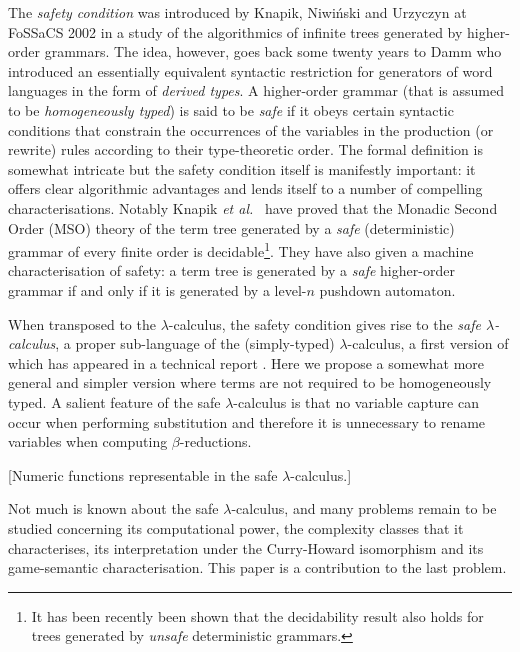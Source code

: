 \documentclass{llncs}
\begin{document}
The \emph{safety condition} was introduced by Knapik, Niwi{\'n}ski and
Urzyczyn at FoSSaCS 2002 \cite{KNU02} in a study of the algorithmics
of infinite trees generated by higher-order grammars. The idea,
however, goes back some twenty years to Damm \cite{Dam82} who
introduced an essentially equivalent syntactic restriction for
generators of word languages in the form of \emph{derived types}.
A higher-order grammar (that is assumed to be \emph{homogeneously
  typed}) is said to be \emph{safe} if it obeys certain syntactic
conditions that constrain the occurrences of the variables in the
production (or rewrite) rules according to their type-theoretic
order. The formal definition is somewhat intricate but the safety
condition itself is manifestly important: it offers clear algorithmic
advantages and lends itself to a number of compelling
characterisations. Notably Knapik \emph{et al.}~\cite{KNU02} have
proved that the Monadic Second Order (MSO) theory of the term tree
generated by a \emph{safe} (deterministic) grammar of every finite
order is decidable\footnote{It has been recently been shown
  \cite{OngLics2006} that the decidability result also holds for trees
  generated by \emph{unsafe} deterministic grammars.}. They have also
given a machine characterisation of safety: a term tree is generated
by a \emph{safe} higher-order grammar if and only if it is generated
by a level-$n$ pushdown automaton.


When transposed to the $\lambda$-calculus, the safety condition gives
rise to the \emph{safe $\lambda$-calculus}, a proper sub-language of
the (simply-typed) $\lambda$-calculus, a first version of which has
appeared in a technical report \cite{safety-mirlong2004}. Here we
propose a somewhat more general and simpler version where terms are
not required to be homogeneously typed. A salient feature of the safe
$\lambda$-calculus is that no variable capture can occur when
performing substitution and therefore it is unnecessary to rename
variables when computing $\beta$-reductions.

[Numeric functions representable in the safe $\lambda$-calculus.]

Not much is known about the safe $\lambda$-calculus, and many problems
remain to be studied concerning its computational power, the
complexity classes that it characterises, its interpretation under the
Curry-Howard isomorphism and its game-semantic characterisation. This
paper is a contribution to the last problem.
\end{document}
